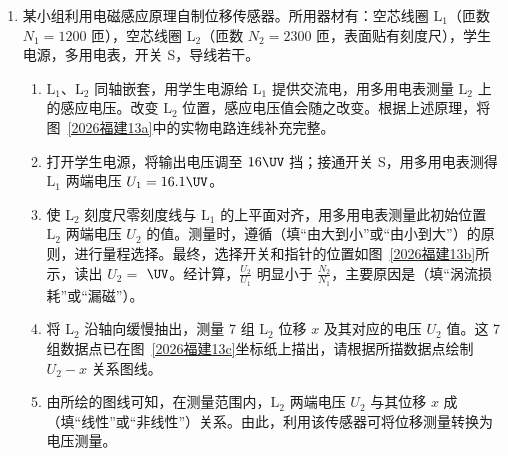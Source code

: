 \documentclass[\gkver]{gaokaozhenti}
\begin{document}
\begin{enumerate}
\item
某小组利用电磁感应原理自制位移传感器。所用器材有：空芯线圈 $\mathrm{L}_1$（匝数 $N_1=1200$ 匝），空芯线圈 $\mathrm{L}_2$（匝数 $N_2=2300$ 匝，表面贴有刻度尺），学生电源，多用电表，开关 S，导线若干。
\begin{enumerate}
	\item
	$\mathrm{L}_1$、$\mathrm{L}_2$ 同轴嵌套，用学生电源给 $\mathrm{L}_1$ 提供交流电，用多用电表测量 $\mathrm{L}_2$ 上的感应电压。改变 $\mathrm{L}_2$ 位置，感应电压值会随之改变。根据上述原理，将图~\ref{2026福建13a}中的实物电路连线补充完整。
	\item
	打开学生电源，将输出电压调至 $16\UV$ 挡；接通开关 S，用多用电表测得 $\mathrm{L}_1$ 两端电压 $U_1=16.1\UV$。
	\item
	使 $\mathrm{L}_2$ 刻度尺零刻度线与 $\mathrm{L}_1$ 的上平面对齐，用多用电表测量此初始位置 $\mathrm{L}_2$ 两端电压 $U_2$ 的值。测量时，遵循（填“由大到小”或“由小到大”）的原则，进行量程选择。最终，选择开关和指针的位置如图~\ref{2026福建13b}所示，读出 $U_2=$ $\UV$。经计算，$\frac{U_2}{U_1}$ 明显小于 $\frac{N_2}{N_1}$，主要原因是（填“涡流损耗”或“漏磁”）。
	\item
	将 $\mathrm{L}_2$ 沿轴向缓慢抽出，测量 7 组 $\mathrm{L}_2$ 位移 $x$ 及其对应的电压 $U_2$ 值。这 7 组数据点已在图~\ref{2026福建13c}坐标纸上描出，请根据所描数据点绘制 $U_2-x$ 关系图线。
	\item
	由所绘的图线可知，在测量范围内，$\mathrm{L}_2$ 两端电压 $U_2$ 与其位移 $x$ 成（填“线性”或“非线性”）关系。由此，利用该传感器可将位移测量转换为电压测量。
\end{enumerate}
\end{enumerate}
\end{document}
